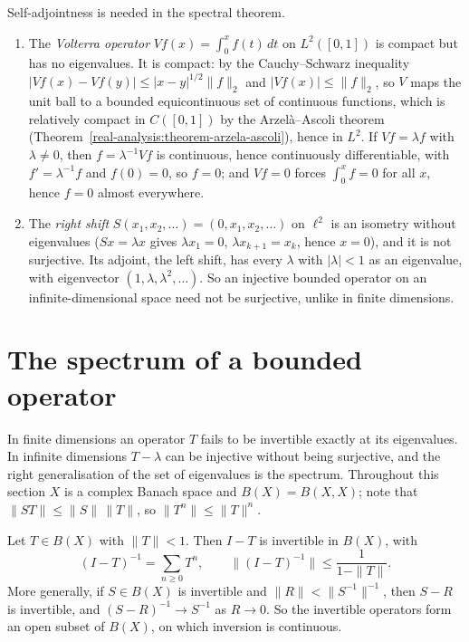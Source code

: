 \begin{counterexample}\label{functional-analysis:counterexample-no-eigenvalues}
Self-adjointness is needed in the spectral theorem.
\begin{enumerate}
\item The \emph{Volterra operator} $Vf(x) = \int_0^xf(t)\,dt$ on $L^2([0, 1])$ is compact but has no eigenvalues. It is compact: by the Cauchy--Schwarz inequality $|Vf(x) - Vf(y)| \leq |x - y|^{1/2}\|f\|_2$ and $|Vf(x)| \leq \|f\|_2$, so
$V$ maps the unit ball to a bounded equicontinuous set of continuous functions, which is relatively compact in $C([0, 1])$ by the Arzel\`a--Ascoli theorem (Theorem~\ref{real-analysis:theorem-arzela-ascoli}), hence in $L^2$. If
$Vf = \lambda f$ with $\lambda \neq 0$, then $f = \lambda^{-1}Vf$ is continuous, hence continuously differentiable, with $f' = \lambda^{-1}f$ and $f(0) = 0$, so $f = 0$; and $Vf = 0$ forces $\int_0^xf = 0$ for all $x$, hence $f = 0$ almost
everywhere.
\item The \emph{right shift} $S(x_1, x_2, \ldots) = (0, x_1, x_2, \ldots)$ on $\ell^2$ is an isometry without eigenvalues ($Sx = \lambda x$ gives $\lambda x_1 = 0$, $\lambda x_{k+1} = x_k$, hence $x = 0$), and it is not surjective. Its adjoint, the left shift, has
every $\lambda$ with $|\lambda| < 1$ as an eigenvalue, with eigenvector $(1, \lambda, \lambda^2, \ldots)$. So an injective bounded operator on an infinite-dimensional space need not be surjective, unlike in finite dimensions.
\end{enumerate}
\end{counterexample}

\section{The spectrum of a bounded operator}\label{functional-analysis:section-spectrum}

In finite dimensions an operator $T$ fails to be invertible exactly at its eigenvalues. In infinite dimensions $T - \lambda$ can be injective without being surjective, and the right generalisation of the set
of eigenvalues is the spectrum. Throughout this section $X$ is a complex Banach space and $B(X) = B(X, X)$; note that $\|ST\| \leq \|S\|\,\|T\|$, so $\|T^n\| \leq \|T\|^n$.

\begin{lemma}\label{functional-analysis:lemma-neumann}
Let $T \in B(X)$ with $\|T\| < 1$. Then $I - T$ is invertible in $B(X)$, with
\[
(I - T)^{-1} = \sum_{n \geq 0}T^n, \qquad \|(I - T)^{-1}\| \leq \frac{1}{1 - \|T\|}.
\]
More generally, if $S \in B(X)$ is invertible and $\|R\| < \|S^{-1}\|^{-1}$, then $S - R$ is invertible, and $(S - R)^{-1} \to S^{-1}$ as $R \to 0$. So the invertible operators form an open subset of $B(X)$, on
which inversion is continuous.
\end{lemma}

